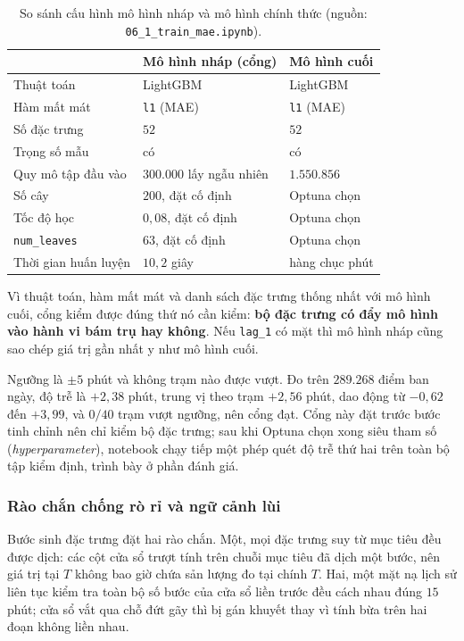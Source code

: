\begin{table}[htbp]
\centering
\caption{So sánh cấu hình mô hình nháp và mô hình chính thức (nguồn: \texttt{06\_1\_train\_mae.ipynb}).}
\label{tab:mo_hinh_nhap}
\small
\begin{tabular}{@{}L{4.6cm} L{4.9cm} L{4.6cm}@{}}
\toprule
 & \textbf{Mô hình nháp (cổng)} & \textbf{Mô hình cuối} \\
\midrule
Thuật toán & LightGBM & LightGBM \\
Hàm mất mát & \texttt{l1} (MAE) & \texttt{l1} (MAE) \\
Số đặc trưng & $52$ & $52$ \\
Trọng số mẫu & có & có \\
\addlinespace
Quy mô tập đầu vào & $300.000$ lấy ngẫu nhiên & $1.550.856$ \\
Số cây & $200$, đặt cố định & Optuna chọn \\
Tốc độ học & $0{,}08$, đặt cố định & Optuna chọn \\
\texttt{num\_leaves} & $63$, đặt cố định & Optuna chọn \\
Thời gian huấn luyện & $10{,}2$ giây & hàng chục phút \\
\bottomrule
\end{tabular}
\end{table}

Vì thuật toán, hàm mất mát và danh sách đặc trưng thống nhất với mô hình cuối, cổng kiểm được đúng
thứ nó cần kiểm: \textbf{bộ đặc trưng có đẩy mô hình vào hành vi bám trụ hay không}. Nếu
\texttt{lag\_1} có mặt thì mô hình nháp cũng sao chép giá trị gần nhất y như mô hình cuối.

Ngưỡng là $\pm 5$ phút và không trạm nào được vượt. Đo trên $289.268$ điểm ban ngày, độ
trễ là $+2{,}38$ phút, trung vị theo trạm $+2{,}56$ phút, dao động từ $-0{,}62$ đến
$+3{,}99$, và $0/40$ trạm vượt ngưỡng, nên cổng đạt. Cổng này đặt trước bước tinh chỉnh
nên chỉ kiểm bộ đặc trưng; sau khi Optuna chọn xong siêu tham số (\textit{hyperparameter}), notebook chạy tiếp một
phép quét độ trễ thứ hai trên toàn bộ tập kiểm định, trình bày ở phần đánh giá.

\subsubsection{Rào chắn chống rò rỉ và ngữ cảnh lùi}

Bước sinh đặc trưng đặt hai rào chắn. Một, mọi đặc trưng suy từ mục tiêu đều được dịch:
các cột cửa sổ trượt tính trên chuỗi mục tiêu đã dịch một bước, nên giá trị tại $T$ không
bao giờ chứa sản lượng đo tại chính $T$. Hai, một mặt nạ lịch sử liên tục kiểm tra toàn
bộ số bước của cửa sổ liền trước đều cách nhau đúng $15$ phút; cửa sổ vắt qua chỗ đứt gãy
thì bị gán khuyết thay vì tính bừa trên hai đoạn không liền nhau.

